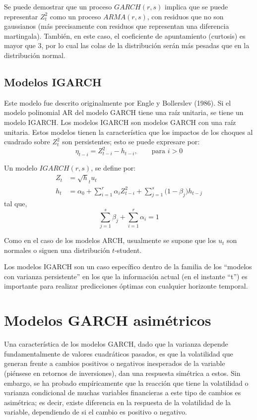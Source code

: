 \begin{observacion}
 Se puede demostrar que un proceso $GARCH(r, s)$ implica que se puede representar $Z_{t}^{2}$ como un proceso $ARMA(r, s)$, con residuos que no son gaussianos (m\'{a}s precisamente con residuos que representan una diferencia martingala). Tambi\'{e}n, en este caso, el coeficiente de apuntamiento (curtosis) es mayor que 3, por lo cual las colas de la distribuci\'{o}n ser\'{a}n m\'{a}s pesadas que en la distribuci\'{o}n normal.
\end{observacion}

\subsection*{Modelos IGARCH}

Este modelo fue descrito originalmente por Engle y Bollerslev (1986). Si el modelo polinomial AR del modelo GARCH tiene una ra\'{i}z unitaria, se tiene un modelo IGARCH. Los modelos IGARCH son modelos GARCH con una ra\'{i}z unitaria. Estos modelos tienen la caracter\'{i}stica que los impactos de los choques al cuadrado sobre $Z_{t}^{2}$ son persistentes; esto se puede expresare por:
\[
\eta_{t-i}=Z_{t-i}^{2}-h_{t-i},\qquad\text{para }i>0
\]

\begin{definicion}
 Un modelo $IGARCH(r,s)$, se define por:
\begin{align*}
Z_{t}&=\sqrt h_{t} u_{t} \\ 
h_{t}&=\alpha_{0}+\sum_{i=1}^r {\alpha_{i}Z_{t-i}^{2}} +\sum_{j=1}^s {{(1-\beta }_{j})h_{t-j}}
\end{align*}
tal que,
\[
\sum_{j=1}^s \beta_{j} +\sum_{i=1}^r \alpha_{i} =1
\]

Como en el caso de los modelos ARCH, usualmente se supone que los $u_{t}$ son normales o siguen una distribuci\'{o}n $t$-student.
\end{definicion}

Los modelos IGARCH son un caso espec\'{i}fico dentro de la familia de los ``modelos con varianza persistente'' en los que la informaci\'{o}n actual (en el instante ``t'') es importante para realizar predicciones \'{o}ptimas con cualquier horizonte temporal.

\section{Modelos GARCH asim\'etricos}

Una caracter\'{i}stica de los modelos GARCH, dado que la varianza depende fundamentalmente de valores cuadr\'{a}ticos pasados, es que la volatilidad que generan frente a cambios positivos o negativos inesperados de la variable (pi\'{e}nsese en retornos de inversiones), dan una respuesta sim\'{e}trica a estos. Sin embargo, se ha probado emp\'{i}ricamente que la reacci\'{o}n que tiene la volatilidad o varianza condicional de muchas variables financieras a este tipo de cambios es asim\'{e}trica; es decir, existe diferencia en la respuesta de la volatilidad de la variable, dependiendo de si el cambio es positivo o negativo.\newline

